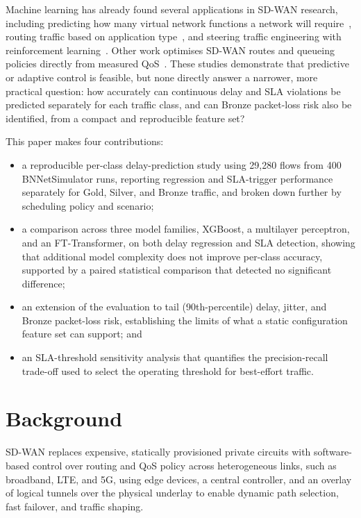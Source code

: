 \documentclass[conference]{IEEEtran}
\begin{document}
Machine learning has already found several applications in SD-WAN research, including predicting how many virtual network functions a network will require~\cite{rahman2019autoscaling}, routing traffic based on application type~\cite{zheng2022applicationaware}, and steering traffic engineering with reinforcement learning~\cite{dinh2024safeloadbalancing,chen2025mteal}. Other work optimises SD-WAN routes and queueing policies directly from measured QoS~\cite{quang2022routing,quang2023globalqos}. These studies demonstrate that predictive or adaptive control is feasible, but none directly answer a narrower, more practical question: how accurately can continuous delay and SLA violations be predicted separately for each traffic class, and can Bronze packet-loss risk also be identified, from a compact and reproducible feature set?

This paper makes four contributions:
\begin{itemize}
    \item a reproducible per-class delay-prediction study using 29,280 flows from 400 BNNetSimulator runs, reporting regression and SLA-trigger performance separately for Gold, Silver, and Bronze traffic, and broken down further by scheduling policy and scenario;
    \item a comparison across three model families, XGBoost, a multilayer perceptron, and an FT-Transformer, on both delay regression and SLA detection, showing that additional model complexity does not improve per-class accuracy, supported by a paired statistical comparison that detected no significant difference;
    \item an extension of the evaluation to tail (90th-percentile) delay, jitter, and Bronze packet-loss risk, establishing the limits of what a static configuration feature set can support; and
    \item an SLA-threshold sensitivity analysis that quantifies the precision-recall trade-off used to select the operating threshold for best-effort traffic.
\end{itemize}

\section{Background}

SD-WAN replaces expensive, statically provisioned private circuits with software-based control over routing and QoS policy across heterogeneous links, such as broadband, LTE, and 5G, using edge devices, a central controller, and an overlay of logical tunnels over the physical underlay to enable dynamic path selection, fast failover, and traffic shaping.
\end{document}

